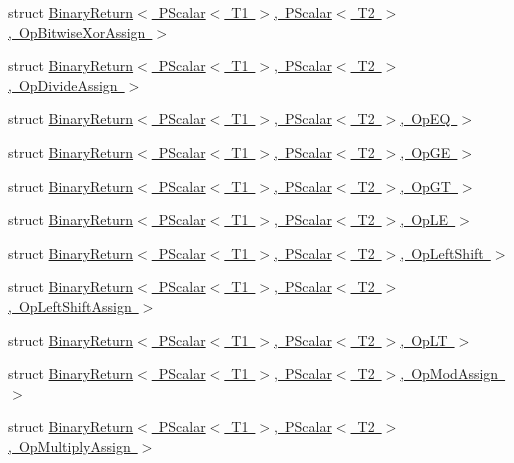 \begin{DoxyCompactItemize}
struct \mbox{\hyperlink{structENSEM_1_1BinaryReturn_3_01PScalar_3_01T1_01_4_00_01PScalar_3_01T2_01_4_00_01OpBitwiseXorAssign_01_4}{Binary\+Return$<$ P\+Scalar$<$ T1 $>$, P\+Scalar$<$ T2 $>$, Op\+Bitwise\+Xor\+Assign $>$}}
\item 
struct \mbox{\hyperlink{structENSEM_1_1BinaryReturn_3_01PScalar_3_01T1_01_4_00_01PScalar_3_01T2_01_4_00_01OpDivideAssign_01_4}{Binary\+Return$<$ P\+Scalar$<$ T1 $>$, P\+Scalar$<$ T2 $>$, Op\+Divide\+Assign $>$}}
\item 
struct \mbox{\hyperlink{structENSEM_1_1BinaryReturn_3_01PScalar_3_01T1_01_4_00_01PScalar_3_01T2_01_4_00_01OpEQ_01_4}{Binary\+Return$<$ P\+Scalar$<$ T1 $>$, P\+Scalar$<$ T2 $>$, Op\+E\+Q $>$}}
\item 
struct \mbox{\hyperlink{structENSEM_1_1BinaryReturn_3_01PScalar_3_01T1_01_4_00_01PScalar_3_01T2_01_4_00_01OpGE_01_4}{Binary\+Return$<$ P\+Scalar$<$ T1 $>$, P\+Scalar$<$ T2 $>$, Op\+G\+E $>$}}
\item 
struct \mbox{\hyperlink{structENSEM_1_1BinaryReturn_3_01PScalar_3_01T1_01_4_00_01PScalar_3_01T2_01_4_00_01OpGT_01_4}{Binary\+Return$<$ P\+Scalar$<$ T1 $>$, P\+Scalar$<$ T2 $>$, Op\+G\+T $>$}}
\item 
struct \mbox{\hyperlink{structENSEM_1_1BinaryReturn_3_01PScalar_3_01T1_01_4_00_01PScalar_3_01T2_01_4_00_01OpLE_01_4}{Binary\+Return$<$ P\+Scalar$<$ T1 $>$, P\+Scalar$<$ T2 $>$, Op\+L\+E $>$}}
\item 
struct \mbox{\hyperlink{structENSEM_1_1BinaryReturn_3_01PScalar_3_01T1_01_4_00_01PScalar_3_01T2_01_4_00_01OpLeftShift_01_4}{Binary\+Return$<$ P\+Scalar$<$ T1 $>$, P\+Scalar$<$ T2 $>$, Op\+Left\+Shift $>$}}
\item 
struct \mbox{\hyperlink{structENSEM_1_1BinaryReturn_3_01PScalar_3_01T1_01_4_00_01PScalar_3_01T2_01_4_00_01OpLeftShiftAssign_01_4}{Binary\+Return$<$ P\+Scalar$<$ T1 $>$, P\+Scalar$<$ T2 $>$, Op\+Left\+Shift\+Assign $>$}}
\item 
struct \mbox{\hyperlink{structENSEM_1_1BinaryReturn_3_01PScalar_3_01T1_01_4_00_01PScalar_3_01T2_01_4_00_01OpLT_01_4}{Binary\+Return$<$ P\+Scalar$<$ T1 $>$, P\+Scalar$<$ T2 $>$, Op\+L\+T $>$}}
\item 
struct \mbox{\hyperlink{structENSEM_1_1BinaryReturn_3_01PScalar_3_01T1_01_4_00_01PScalar_3_01T2_01_4_00_01OpModAssign_01_4}{Binary\+Return$<$ P\+Scalar$<$ T1 $>$, P\+Scalar$<$ T2 $>$, Op\+Mod\+Assign $>$}}
\item 
struct \mbox{\hyperlink{structENSEM_1_1BinaryReturn_3_01PScalar_3_01T1_01_4_00_01PScalar_3_01T2_01_4_00_01OpMultiplyAssign_01_4}{Binary\+Return$<$ P\+Scalar$<$ T1 $>$, P\+Scalar$<$ T2 $>$, Op\+Multiply\+Assign $>$}}

\end{DoxyCompactItemize}
